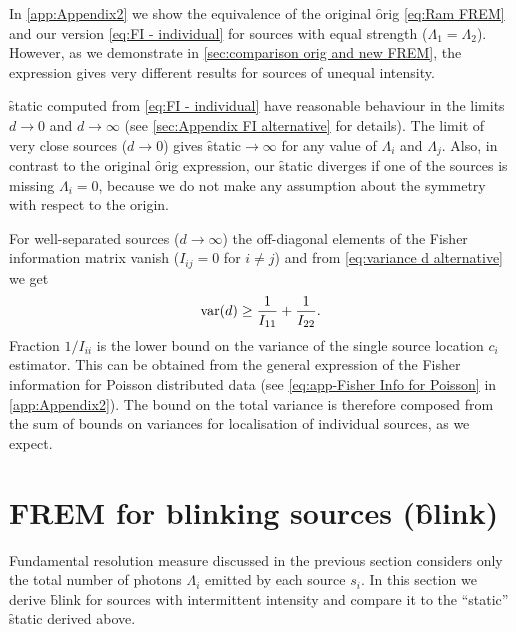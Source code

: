 In \autoref{app:Appendix2} we show the equivalence of the original \f{orig} \autoref{eq:Ram FREM} and our version \autoref{eq:FI - individual} for sources with equal strength ($\Lambda_1=\Lambda_2$). However, as we demonstrate in \autoref{sec:comparison orig and new FREM}, the expression gives very different results for sources of unequal intensity. 

\f{static} computed from \autoref{eq:FI - individual} have reasonable behaviour in the limits $d\rightarrow0$ and $d\rightarrow\infty$ (see \autoref{sec:Appendix FI alternative} for details). The limit of very close sources ($d\rightarrow0$) gives \f{static}$\rightarrow\infty$ for any value of $\Lambda_i$ and $\Lambda_j$. Also, in contrast to the original \f{orig} expression, our \f{static} diverges if one of the sources is missing $\Lambda_i=0$, because we do not make any assumption about the symmetry with respect to the origin. 

For well-separated sources ($d\rightarrow\infty$) the off-diagonal elements of the Fisher information matrix vanish ($I_{ij}=0$ for $i\neq j$) and from \autoref{eq:variance d alternative} we get
%
\begin{equation}
 	\mathrm{var}(d)\geq\frac{1}{I_{11}}+\frac{1}{I_{22}}.
\end{equation}
%
Fraction $1/I_{ii}$ is the lower bound on the variance of the single source location $c_i$ estimator. This can be obtained from the general expression of the Fisher information for Poisson distributed data (see \autoref{eq:app-Fisher Info for Poisson} in \autoref{app:Appendix2}). The bound on the total variance is therefore composed from the sum of bounds on variances for localisation of individual sources, as we expect.



\section{FREM for blinking sources (\f{blink})\label{sec:FREM for blinking}}

Fundamental resolution measure discussed in the previous section considers only the total number of photons $\Lambda_i$ emitted by each source $s_i$. In this section we derive \f{blink} for sources with intermittent intensity and compare it to the ``static'' \f{static} derived above. 

